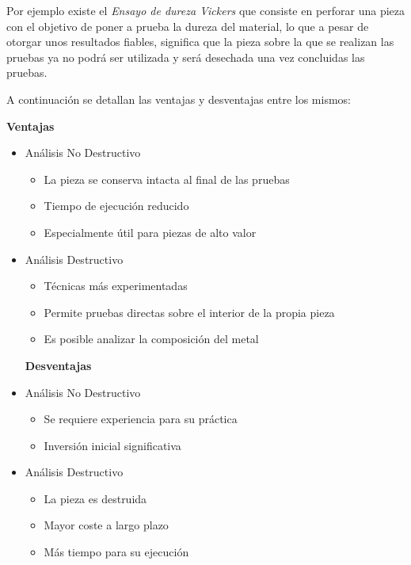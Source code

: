 Por ejemplo existe el \emph{Ensayo de dureza Vickers} que consiste en perforar una pieza con el objetivo de poner a prueba la dureza del material, lo que a pesar de otorgar unos resultados fiables, significa que la pieza sobre la que se realizan las pruebas ya no podrá ser utilizada y será desechada una vez concluidas las pruebas.


A continuación se detallan las ventajas y desventajas entre los mismos:

    \textbf{Ventajas}
    \begin{itemize}
        \item{Análisis No Destructivo}
            \begin{itemize}
                \item La pieza se conserva intacta al final de las pruebas
                \item Tiempo de ejecución reducido
                \item Especialmente útil para piezas de alto valor
            \end{itemize}
        \item{Análisis Destructivo}
            \begin{itemize}
                \item Técnicas más experimentadas
                \item Permite pruebas directas sobre el interior de la propia pieza
                \item Es posible analizar la composición del metal
            \end{itemize}
            
    \textbf{Desventajas}
        \item{Análisis No Destructivo}
            \begin{itemize}
                \item Se requiere experiencia para su práctica
                \item Inversión inicial significativa
            \end{itemize}
        \item{Análisis Destructivo}
            \begin{itemize}
                \item La pieza es destruida
                \item Mayor coste a largo plazo
                \item Más tiempo para su ejecución
            \end{itemize}
    \end{itemize}
    
